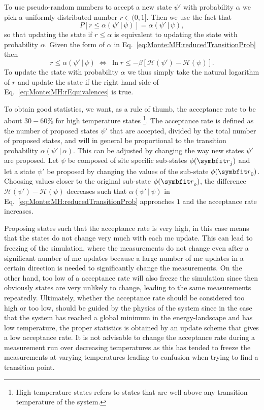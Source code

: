 To use pseudo-random numbers to accept a new state $\psi'$ with probability $\alpha$ we pick a uniformly distributed number $r\in(0,1]$. Then
we use the fact that
\begin{equation}
    \label{eq:Monte:MH:rProbability}
    P[r \leq \alpha(\psi'\,|\,\psi)] = \alpha(\psi'\,|\,\psi),
\end{equation}
so that updating the state if $r\leq\alpha$ is equivalent to updating the state with probability $\alpha$. Given the form of $\alpha$ in
Eq.~\eqref{eq:Monte:MH:reducedTransitionProb} then
\begin{equation}
    \label{eq:Monte:MH:rEquivalences}
    r \leq \alpha(\psi'\,|\,\psi)\;\Leftrightarrow\;\ln r \leq -\beta[\mathcal{H}(\psi')-\mathcal{H}(\psi)].
\end{equation}
To update the state with probability $\alpha$ we thus simply take the natural logarithm of $r$ and update the state if the right hand
side of Eq.~\eqref{eq:Monte:MH:rEquivalences} is true.

To obtain good statistics, we want, as a rule of thumb, the acceptance rate to be about $30-60\%$ for high temperature states%
\footnote{High temperature states refers to states that are well above any transition temperature of the system.}. %
The acceptance rate is defined as the
number of proposed states $\psi'$ that are accepted, divided by the total number of proposed states, and will in general be proportional
to the transition probability $\alpha(\psi'\,|\,\alpha)$. This can be adjusted by changing the way
new states $\psi'$ are proposed. Let $\psi$ be composed of site specific sub-states $\phi(\v{r}_j)$ and let a state $\psi'$ be proposed
by changing the values of the sub-state $\phi(\v{r}_0)$. Choosing values closer to the original sub-state $\phi(\v{r}_o)$, the difference
$\mathcal{H}(\psi')-\mathcal{H}(\psi)$ decreases such that $\alpha(\psi'\,|\,\psi)$ in
Eq.~\eqref{eq:Monte:MH:reducedTransitionProb} approaches $1$ and the acceptance rate increases.

Proposing states such that the acceptance rate is very high, in this case means that the states do not change very much with each \ac{mc} update. This
can lead to freezing of the simulation, where the measurements do not change even after a significant number of \ac{mc} updates because
a large number of \ac{mc} updates in a certain direction is needed to significantly change the measurements. On the other hand, too low
of a acceptance rate will also freeze the simulation since then obviously states are very unlikely to change, leading to the same
measurements repeatedly. Ultimately, whether the acceptance rate should be considered too high or too low, should be guided by the physics of
the system since in the case that the system has reached a global minimum in the energy-landscape and has low temperature,
the proper statistics is obtained by
an update scheme that gives a low acceptance rate. It is not advisable to change the acceptance rate during a measurement run over
decreasing temperatures as this has tended to freeze the measurements at varying temperatures leading to confusion when trying to
find a transition point.

